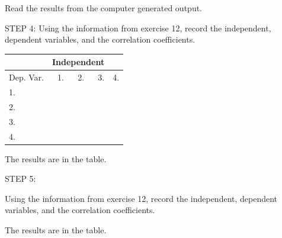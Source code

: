 \documentclass[11pt, chapterprefix=true]{scrbook}\usepackage[]{graphicx}\usepackage[]{color}
\begin{document}
\begin{exercises}
\begin{solution}
       Read the results from the computer generated output.

    \end{solution}

  \begin{exercise} %


    STEP 4: Using the information from exercise 12, record the independent, dependent variables, and the correlation coefficients.

     \begin{table}[ht]
     \centering
     {\tiny{
     \begin{tabular}{lrrrr} \hline
         &  \multicolumn{3}{c}{Independent} \\ \hline

     Dep. Var. & 1. \underline{\phantom{xxxx}} &
                 2. \underline{\phantom{xxxx}} &
                 3. \underline{\phantom{xxxx}} &
                 4. \underline{\phantom{xxxx}} \\ \hline
     1. \underline{\phantom{xxxx}}  &
     \underline{\phantom{xxxx}}  \\ \hline
     2. \underline{\phantom{xxxx}}  &
     \underline{\phantom{xxxx}} &
     \underline{\phantom{xxxx}}  \\ \hline
     3. \underline{\phantom{xxxx}}  &
     \underline{\phantom{xxxx}} &
     \underline{\phantom{xxxx}} &
     \underline{\phantom{xxxx}}  \\ \hline
     4. \underline{\phantom{xxxx}}  &
     \underline{\phantom{xxxx}} &
     \underline{\phantom{xxxx}} &
     \underline{\phantom{xxxx}} &
     \underline{\phantom{xxxx}}  \\ \hline
     \end{tabular}
     }}
     \end{table}


    \end{exercise}
    \vspace{2mm}
    \begin{solution}

      The results are in the table.

    \end{solution}

  \begin{exercise} %


    STEP 5:

    Using the information from exercise 12, record the independent, dependent variables, and the correlation coefficients.



    \end{exercise}
    \vspace{2mm}
    \begin{solution}

  The results are in the table.


    \end{solution}


\end{exercises}
\end{document}

